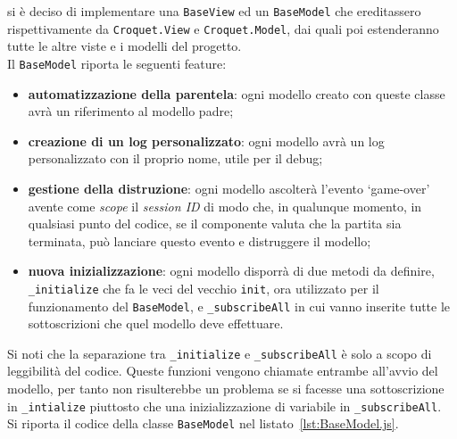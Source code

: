 si è deciso di implementare una \texttt{BaseView} ed un \texttt{BaseModel} che ereditassero rispettivamente da \texttt{Croquet.View} e \texttt{Croquet.Model}, dai quali poi estenderanno
tutte le altre viste e i modelli del progetto.\\
Il \texttt{BaseModel} riporta le seguenti feature:
\begin{itemize}
    \item \textbf{automatizzazione della parentela}: ogni modello creato con queste classe avrà un riferimento al modello padre;
    \item \textbf{creazione di un log personalizzato}: ogni modello avrà un log personalizzato con il proprio nome, utile per il debug;
    \item \textbf{gestione della distruzione}: ogni modello ascolterà l'evento `game-over' avente come \textit{scope} il \textit{session ID} di modo che, in qualunque momento, in qualsiasi
    punto del codice, se il componente valuta che la partita sia terminata, può lanciare questo evento e distruggere il modello;
    \item \textbf{nuova inizializzazione}: ogni modello disporrà di due metodi da definire, \texttt{\_initialize} che fa le veci del vecchio \texttt{init}, ora utilizzato per il funzionamento
    del \texttt{BaseModel}, e \texttt{\_subscribeAll} in cui vanno inserite tutte le sottoscrizioni che quel modello deve effettuare.
\end{itemize}
Si noti che la separazione tra \texttt{\_initialize} e \texttt{\_subscribeAll} è solo a scopo di leggibilità del codice. Queste funzioni vengono chiamate entrambe all'avvio del modello, per
tanto non risulterebbe un problema se si facesse una sottoscrizione in \texttt{\_intialize} piuttosto che una inizializzazione di variabile in \texttt{\_subscribeAll}.\\
Si riporta il codice della classe \texttt{BaseModel} nel listato~\ref{lst:BaseModel.js}.

